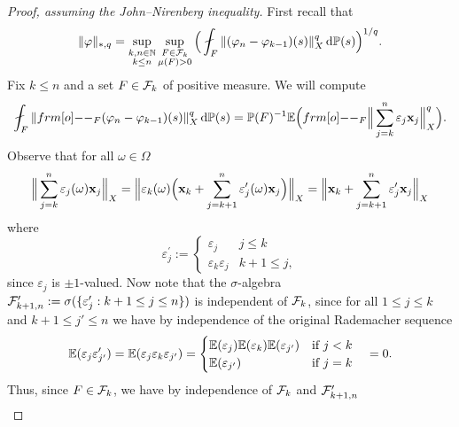 \begin{proof}[Proof, assuming the John--Nirenberg inequality]
  First recall that
  \begin{equation*}
    \|\phi\|_{*,q} =  \sup_{\substack{k,n \in \N \\ k \leq n}} \sup_{\substack{F \in \mc{F}_k \\ \mu(F) > 0}} \Big( \fint_{F} \|(\phi_n - \phi_{k-1})(s)\|_{X}^{q} \, \dd\P(s)\Big)^{1/q}.
  \end{equation*}
  Fix $k \leq n$ and a set $F \in \mathcal{F}_k$ of positive measure.
  We will compute
  \begin{equation*}
    \fint_{F} \|\1_{F} (\phi_n - \phi_{k-1})(s)\|_{X}^q \, \dd\P(s) = \P(F)^{-1} \E \Big( \1_{F} \Big\| \sum_{j=k}^{n} \varepsilon_j \mb{x}_j\Big\|_{X}^q \Big).
  \end{equation*}
  Observe that for all $\omega \in \Omega$
  \begin{equation*}
    \Big\| \sum_{j=k}^{n} \varepsilon_j(\omega) \mathbf{x}_j\Big\|_{X} = \Big\| \varepsilon_k(\omega) \Big( \mathbf{x}_k + \sum_{j=k+1}^{n} \varepsilon_{j}^{\prime}(\omega) \mathbf{x}_j \Big) \Big\|_{X} = \Big\|\mathbf{x}_k + \sum_{j=k+1}^{n} \varepsilon_{j}^{\prime} \mathbf{x}_j \Big\|_{X}
  \end{equation*}
  where
  \begin{equation*}
    \varepsilon_{j}^{\prime} :=
    \begin{cases}
      \varepsilon_{j} & j \leq k \\
      \varepsilon_{k} \varepsilon_{j} & k+1 \leq j,
    \end{cases}
  \end{equation*}
  since $\varepsilon_j$ is $\pm 1$-valued.
  Now note that the $\sigma$-algebra $\mathcal{F}^\prime_{k+1,n} := \sigma(\{\varepsilon_j^\prime : k+1 \leq j \leq n\})$ is independent of $\mathcal{F}_k$, since for all $1 \leq j \leq k$ and $k+1 \leq j' \leq n$ we have by independence of the original Rademacher sequence
  \begin{equation*}
    \mathbb{E}(\varepsilon_j \varepsilon_{j'}^\prime) = \mathbb{E}(\varepsilon_j \varepsilon_k \varepsilon_{j'})
    =
    \begin{cases}
      \mathbb{E}(\varepsilon_j) \mathbb{E}(\varepsilon_k) \mathbb{E}(\varepsilon_{j'}) & \text{if $j < k$} \\
       \mathbb{E}(\varepsilon_{j'}) & \text{if $j = k$}
    \end{cases}
    \quad = 0.
  \end{equation*}
  Thus, since $F \in \mathcal{F}_k$, we have by independence of $\mathcal{F}_k$ and $\mathcal{F}^{\prime}_{k+1, n}$
  \begin{equation*}
    \begin{aligned}

\end{aligned}
\end{equation*}
\end{proof}
